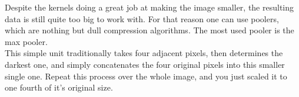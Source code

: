 Despite the kernels doing a great job at making the image smaller, the resulting data is still quite too big to work with.  
For that reason one can use poolers, which are nothing but dull compression algorithms.
The most used pooler is the max pooler. \cite{Graham2014}  \\
This simple unit traditionally takes four adjacent pixels, then determines the darkest one, and simply concatenates the four original pixels into this smaller single one.  
Repeat this process over the whole image, and you just scaled it to one fourth of it's original size.